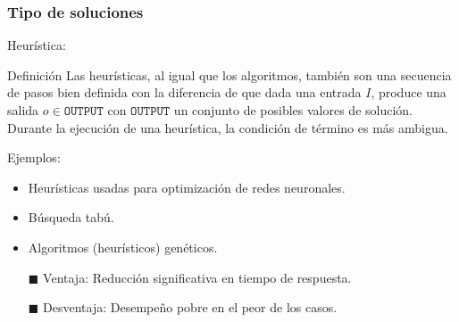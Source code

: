 \begin{frame}
\frametitle{Tipo de soluciones}

Heurística:
\begin{block}{Definición}
Las heurísticas, al igual que los algoritmos, también son una secuencia de pasos bien definida con la diferencia de que dada una
entrada $I$, produce una salida $o \in \texttt{OUTPUT}$ con $\texttt{OUTPUT}$ un
conjunto de posibles valores de solución. Durante la ejecución de una heurística, la condición de término es más ambigua.
\end{block}

\pause

Ejemplos: 


\begin{itemize}
\item Heurísticas usadas para optimización de redes neuronales.
\item Búsqueda tabú.
\item Algoritmos (heurísticos) genéticos.
\end{itemize}

\pause

\begin{itemize}
		\item[$\blacksquare$] Ventaja: Reducción significativa en tiempo de respuesta.
		\item[$\blacksquare$] Desventaja: Desempeño pobre en el peor de los casos.
\end{itemize}

\end{frame}